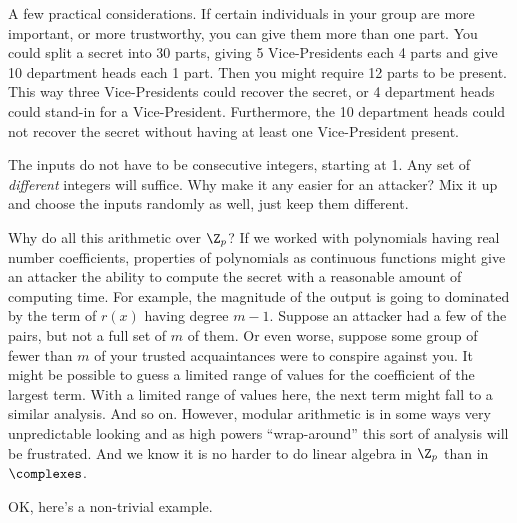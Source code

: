 %
A few practical considerations.  If certain individuals in your group are more important, or more trustworthy, you can give them more than one part.  You could split a secret into 30 parts, giving 5 Vice-Presidents each 4 parts and give 10 department heads each 1 part.  Then you might require 12 parts to be present.  This way three Vice-Presidents could recover the secret, or 4 department heads could stand-in for a Vice-President.  Furthermore, the 10 department heads could not recover the secret without having at least one Vice-President present.\par
%
The inputs do not have to be consecutive integers, starting at 1.  Any set of {\em different} integers will suffice.  Why make it any easier for an attacker?  Mix it up and choose the inputs randomly as well, just keep them different.\par
%
Why do all this arithmetic over $\Z_p$?  If we worked with polynomials having real number coefficients, properties of polynomials as continuous functions might give an attacker the ability to compute the secret with a reasonable amount of computing time.  For example, the magnitude of the output is going to dominated by the term of $r(x)$ having degree $m-1$.  Suppose an attacker had a few of the pairs, but not a full set of $m$ of them.  Or even worse, suppose some group of fewer than $m$ of your trusted acquaintances were to conspire against you.  It might be possible to guess a limited range of values for the coefficient of the largest term.  With a limited range of values here, the next term might fall to a similar analysis.  And so on.  However, modular arithmetic is in some ways very unpredictable looking and as high powers ``wrap-around'' this sort of analysis will be frustrated.  And we know it is no harder to do linear algebra in $\Z_p$ than in $\complexes$.\par
%
OK, here's a non-trivial example.  
%

